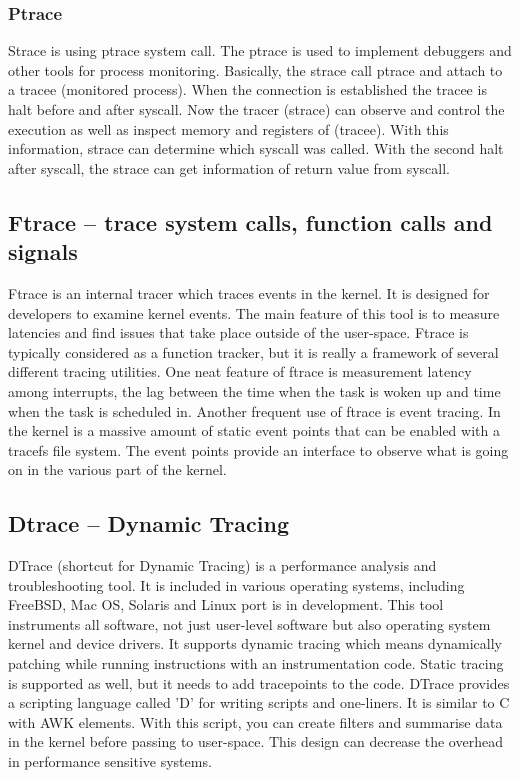 \subsubsection{Ptrace}
Strace is using ptrace\cite{ptrace_man} system call.
The ptrace is used to  implement debuggers and other tools for process monitoring.
Basically, the strace call ptrace and attach to a tracee (monitored process).
When the connection is established the tracee is halt before and after syscall.
Now the tracer (strace) can observe and control the execution as well as inspect memory and registers of (tracee).
With this information, strace can determine which syscall was called.
With the second halt after syscall, the strace can get information of return value from syscall.

\subsection{Ftrace -- trace system calls, function calls and signals}
Ftrace\cite{ftrace_man} is an internal tracer which traces events in the kernel.
It is designed for developers to examine kernel events.
The main feature of this tool is to measure latencies and find issues that take place outside of the user-space.
Ftrace is typically considered as a function tracker,
but it is really a framework of several different tracing utilities.
One neat feature of ftrace is measurement latency among interrupts, the lag between the time when the task is woken up and time when the task is scheduled in.
Another frequent use of ftrace is event tracing.
In the kernel is a massive amount of static event points that can be enabled with a tracefs file system.
The event points provide an interface to observe what is going on in the various part of the kernel.

\subsection{Dtrace -- Dynamic Tracing}
DTrace\cite{dtrace_man}\cite{dtrace_about} (shortcut for Dynamic Tracing) is a performance analysis and troubleshooting tool.
It is included in various operating systems, including FreeBSD, Mac OS, Solaris and Linux port is in development.
This tool instruments all software, not just user-level software but also operating system kernel and device drivers.
It supports dynamic tracing which means dynamically patching while running instructions with an instrumentation code.
Static tracing is supported as well, but it needs to add tracepoints to the code.
DTrace provides a scripting language called 'D' for writing scripts and one-liners.
It is similar to C with AWK elements.
With this script, you can create filters and summarise data in the kernel before passing to user-space.
This design can decrease the overhead in performance sensitive systems.

